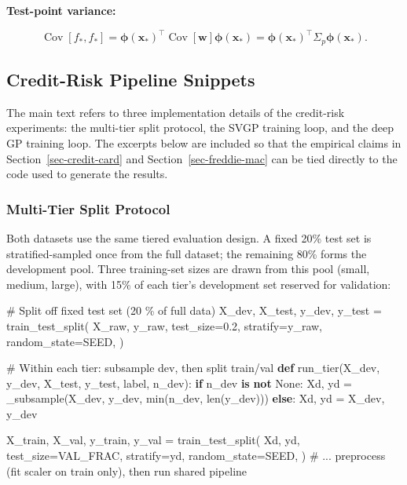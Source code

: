 \documentclass[
  letterpaper,
  DIV=11,
  numbers=noendperiod]{scrartcl}
\newenvironment{Shaded}{\begin{snugshade}}{\end{snugshade}}
\newcommand{\BuiltInTok}[1]{\textcolor[rgb]{0.00,0.23,0.31}{#1}}
\newcommand{\CommentTok}[1]{\textcolor[rgb]{0.37,0.37,0.37}{#1}}
\newcommand{\ControlFlowTok}[1]{\textcolor[rgb]{0.00,0.23,0.31}{\textbf{#1}}}
\newcommand{\FloatTok}[1]{\textcolor[rgb]{0.68,0.00,0.00}{#1}}
\newcommand{\KeywordTok}[1]{\textcolor[rgb]{0.00,0.23,0.31}{\textbf{#1}}}
\newcommand{\NormalTok}[1]{\textcolor[rgb]{0.00,0.23,0.31}{#1}}
\newcommand{\OperatorTok}[1]{\textcolor[rgb]{0.37,0.37,0.37}{#1}}
\newcommand{\VariableTok}[1]{\textcolor[rgb]{0.07,0.07,0.07}{#1}}
\begin{document}
\textbf{Test-point variance:}

\[
\operatorname{Cov}[f_*, f_*] = \boldsymbol{\phi}(\mathbf{x}_*)^\top\operatorname{Cov}[\mathbf{w}]\boldsymbol{\phi}(\mathbf{x}_*) = \boldsymbol{\phi}(\mathbf{x}_*)^\top\Sigma_p\boldsymbol{\phi}(\mathbf{x}_*).
\]

\subsection{Credit-Risk Pipeline
Snippets}\label{sec-credit-risk-pipeline-snippets}

The main text refers to three implementation details of the credit-risk
experiments: the multi-tier split protocol, the SVGP training loop, and
the deep GP training loop. The excerpts below are included so that the
empirical claims in Section~\ref{sec-credit-card} and
Section~\ref{sec-freddie-mac} can be tied directly to the code used to
generate the results.

\subsubsection{Multi-Tier Split
Protocol}\label{sec-credit-risk-splits-snippet}

Both datasets use the same tiered evaluation design. A fixed 20\% test
set is stratified-sampled once from the full dataset; the remaining 80\%
forms the development pool. Three training-set sizes are drawn from this
pool (small, medium, large), with 15\% of each tier's development set
reserved for validation:

\begin{Shaded}
\begin{Highlighting}[]
\CommentTok{\# Split off fixed test set (20 \% of full data)}
\NormalTok{X\_dev, X\_test, y\_dev, y\_test }\OperatorTok{=}\NormalTok{ train\_test\_split(}
\NormalTok{    X\_raw, y\_raw, test\_size}\OperatorTok{=}\FloatTok{0.2}\NormalTok{, stratify}\OperatorTok{=}\NormalTok{y\_raw, random\_state}\OperatorTok{=}\NormalTok{SEED,}
\NormalTok{)}

\CommentTok{\# Within each tier: subsample dev, then split train/val}
\KeywordTok{def}\NormalTok{ run\_tier(X\_dev, y\_dev, X\_test, y\_test, label, n\_dev):}
    \ControlFlowTok{if}\NormalTok{ n\_dev }\KeywordTok{is} \KeywordTok{not} \VariableTok{None}\NormalTok{:}
\NormalTok{        Xd, yd }\OperatorTok{=}\NormalTok{ \_subsample(X\_dev, y\_dev, }\BuiltInTok{min}\NormalTok{(n\_dev, }\BuiltInTok{len}\NormalTok{(y\_dev)))}
    \ControlFlowTok{else}\NormalTok{:}
\NormalTok{        Xd, yd }\OperatorTok{=}\NormalTok{ X\_dev, y\_dev}

\NormalTok{    X\_train, X\_val, y\_train, y\_val }\OperatorTok{=}\NormalTok{ train\_test\_split(}
\NormalTok{        Xd, yd, test\_size}\OperatorTok{=}\NormalTok{VAL\_FRAC, stratify}\OperatorTok{=}\NormalTok{yd, random\_state}\OperatorTok{=}\NormalTok{SEED,}
\NormalTok{    )}
    \CommentTok{\# ... preprocess (fit scaler on train only), then run shared pipeline}
\end{Highlighting}
\end{Shaded}
\end{document}
